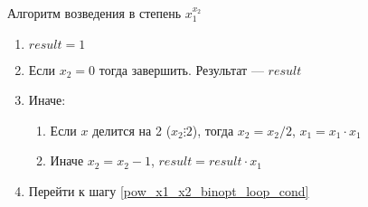 Алгоритм возведения в степень $x_1^{x_2}$
\begin{enumerate}
 \item $result = 1$
 \item \label{pow_x1_x2_binopt_loop_cond} Если $x_2=0$ тогда завершить. Результат --- $result$
 \item Иначе:
 \begin{enumerate}
  \item Если $x$ делится на 2 ($x_2 \vdots 2$), тогда $x_2 = x_2 / 2$, $x_1 = x_1 \cdot x_1$
  \item Иначе $x_2 = x_2 - 1$, $result = result \cdot x_1$
 \end{enumerate}
 \item Перейти к шагу \ref{pow_x1_x2_binopt_loop_cond}
\end{enumerate}

